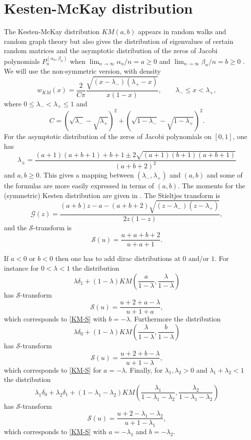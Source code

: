 \documentclass[12pt]{article}
\newcommand{\St}{\mathcal{S}} %
\newcommand{\Gt}{\mathcal{G}} %
\numberwithin{equation}{section}
\begin{document}
\section{Kesten-McKay distribution}
The Kesten-McKay distribution $KM(a,b)$ appears in random walks and random graph theory \cite{Kesten,McKay} but also gives the distribution of eigenvalues of certain random matrices and the asymptotic distribution of the zeros of Jacobi polynomials $P_n^{(\alpha_n,\beta_n)}$ when $\lim_{n \to \infty} \alpha_n/n = a \geq 0$ and $\lim_{n \to \infty} \beta_n/n = b  \geq 0$ \cite{Gawronski}.   We will use the non-symmetric version, with density
\begin{equation}   \label{KM}
    w_{KM}(x) = \frac{2}{C\pi} \frac{\sqrt{(x-\lambda_-)(\lambda_+-x)}}{x(1-x)}, \qquad  \lambda_- \leq x < \lambda_+ , 
\end{equation}
where $0 \leq \lambda_- < \lambda_+ \leq 1$ and
\[   C= (\sqrt{\lambda_-}-\sqrt{\lambda_+})^2+(\sqrt{1-\lambda_-}-\sqrt{1-\lambda_+})^2. \]
For the asymptotic distribution of the zeros of Jacobi polynomials on $[0,1]$, one has
\[      \lambda_{\pm} = \frac{(a+1)(a+b+1)+b+1 \pm 2\sqrt{(a+1)(b+1)(a+b+1)}}{(a+b+2)^2} \]
and $a,b \geq 0$. This gives a mapping between $(\lambda_-,\lambda_+)$ and $(a,b)$ and some of the formulas are more easily expressed in terms of $(a,b)$.
The moments for the (symmetric) Kesten distribution are given in \cite{Hasegawa-Saito}. The Stieltjes transform is
\begin{equation}   \label{KM-G}
   \Gt(z) = \frac{(a+b)z-a - (a+b+2)\sqrt{(z-\lambda_-)(z-\lambda_+)}}{2z(1-z)}, 
 \end{equation}  
and the $\St$-transform is
\begin{equation}  \label{KM-S}
   \St(u) = \frac{u+a+b+2}{u+a+1}.  
\end{equation}

If $a <0$ or $b < 0$ then one has to add dirac distributions at $0$ and/or $1$. For instance
for $0 < \lambda < 1$ the distribution
\[   \lambda \delta_1 + (1-\lambda) KM\left(\frac{a}{1-\lambda},\frac{\lambda}{1-\lambda}\right) \]
has $\St$-transform
\begin{equation} \label{MK-S1}
    \St(u) = \frac{u+2+a-\lambda}{u+1+a}, 
 \end{equation}
 which corresponds to \eqref{KM-S} with $b=-\lambda$. Furthermore the distribution
 \[    \lambda \delta_0 + (1-\lambda) KM\left( \frac{\lambda}{1-\lambda},\frac{b}{1-\lambda}
     \right)  \]
 has $\St$-transform
 \begin{equation}   \label{MK-S0}
     \St(u) = \frac{u+2+b-\lambda}{u+1-\lambda},
  \end{equation}
 which corresponds to \eqref{KM-S} for $a=-\lambda$.    
Finally, for $\lambda_1,\lambda_2 >0$ and $\lambda_1+\lambda_2 < 1$ the distribution
\[  \lambda_1 \delta_0 + \lambda_2 \delta_1 + (1-\lambda_1-\lambda_2) KM \left( \frac{\lambda_1}{1-\lambda_1-\lambda_2}, \frac{\lambda_2}{1-\lambda_1-\lambda_2}\right) \]
has $\St$-transform
\begin{equation} \label{KM-01}
     \St(u) = \frac{u+2-\lambda_1-\lambda_2}{u+1-\lambda_1}, 
\end{equation}
which corresponds to \eqref{KM-S} with $a=-\lambda_1$ and $b=-\lambda_2$.     
\end{document}
